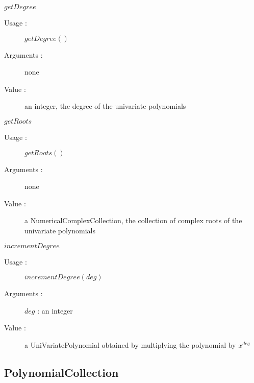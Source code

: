 \begin{description}
\begin{description}
  \item $getDegree$
    \begin{description}
    \item[Usage :] $getDegree()$
    \item[Arguments :] none
    \item[Value :] an integer, the degree of the univariate polynomials
    \end{description}
    \bigskip

  \item $getRoots$
    \begin{description}
    \item[Usage :] $getRoots()$
    \item[Arguments :] none
    \item[Value :] a NumericalComplexCollection, the collection of complex roots of the univariate polynomials
    \end{description}
    \bigskip

  \item $incrementDegree$
    \begin{description}
    \item[Usage :] $incrementDegree(deg)$
    \item[Arguments :] $deg$ : an integer
    \item[Value :] a UniVariatePolynomial obtained by multiplying the polynomial by $x^{deg}$
    \end{description}

  \end{description}

\end{description}





\newpage \subsection{PolynomialCollection}

